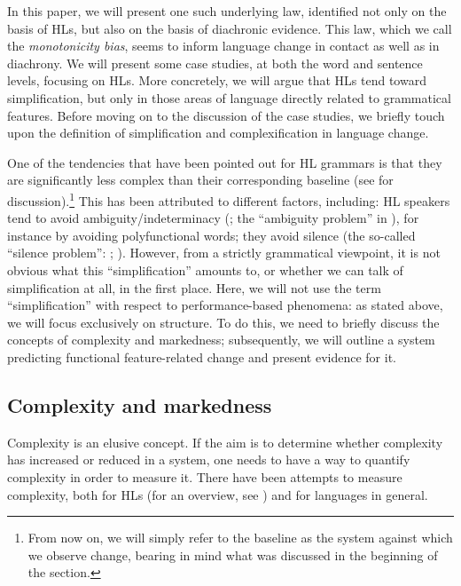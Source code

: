 \documentclass[output=paper]{langscibook}
\begin{document}
In this paper, we will present one such underlying law, identified not only on the basis of HLs, but also on the basis of diachronic evidence. This law, which we call the \textit{monotonicity bias}, seems to inform language change in contact as well as in diachrony. We will present some case studies, at both the word and sentence levels, focusing on HLs. More concretely, we will argue that HLs tend toward simplification, but only in those areas of language directly related to grammatical features. Before moving on to the discussion of the case studies, we briefly touch upon the definition of simplification and complexification in language change. 

One of the tendencies that have been pointed out for HL grammars is that they are significantly less complex than their corresponding baseline (see \citealt{PolinskyScontras2020} for discussion).\footnote{From now on, we will simply refer to the baseline as the system against which we observe change, bearing in mind what was discussed in the beginning of the section.} This has been attributed to different factors, including: HL speakers tend to avoid ambiguity/indeterminacy (\citealt[5.2]{Polinsky2018}; the ``ambiguity problem'' in \citealt{PolinskyScontras2020}), for instance by avoiding polyfunctional words; they avoid silence (the so-called ``silence problem'': \citealt{LalekoPolinsky2017}; \citealt[6.5]{Polinsky2018}). However, from a strictly grammatical viewpoint, it is not obvious what this ``simplification'' amounts to, or whether we can talk of simplification at all, in the first place. Here, we will not use the term ``simplification'' with respect to performance-based phenomena: as stated above, we will focus exclusively on structure. To do this, we need to briefly discuss the concepts of complexity and markedness; subsequently, we will outline a system predicting functional feature-related change and present evidence for it.

\subsection{Complexity and markedness\label{sec:m}}

Complexity is an elusive concept. If the aim is to determine whether complexity has increased or reduced in a system, one needs to have a way to quantify complexity in order to measure it. There have been attempts to measure complexity, both for HLs (for an overview, see ) and for languages in general. 
\end{document}
